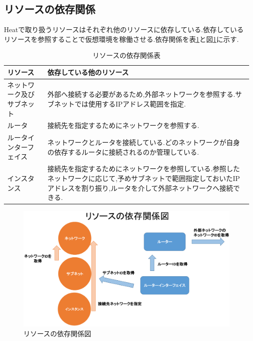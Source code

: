 \documentclass[mingoth]{kut-paper}		%
\begin{document}
	\subsection{リソースの依存関係}
	Heatで取り扱うリソースはそれぞれ他のリソースに依存している.依存しているリソースを参照することで仮想環境を稼働させる.依存関係を表\ref{table:4}と図\ref{graf:7}に示す.
	\begin{table}[H]
		\begin{center}
			\caption{リソースの依存関係表}
			\label{table:4}
			\begin{tabular}{|p{5cm}|p{7cm}|}\hline
				リソース & 依存している他のリソース\\ \hline \hline
				ネットワーク及びサブネット & 外部へ接続する必要があるため,外部ネットワークを参照する.サブネットでは使用するIPアドレス範囲を指定.\\ \hline
				ルータ & 接続先を指定するためにネットワークを参照する.\\ \hline
				ルータインターフェイス & ネットワークとルータを接続している.どのネットワークが自身の依存するルータに接続されるのか管理している.\\ \hline
				インスタンス & 接続先を指定するためにネットワークを参照している.参照したネットワークに応じて,予めサブネットで範囲指定しておいたIPアドレスを割り振り,ルータを介して外部ネットワークへ接続できる.\\ \hline
			\end{tabular}
		\end{center}
	\end{table}
	
	\begin{figure}[H]
		\begin{center}
			\includegraphics[scale=0.45]{Document/ResourcesRelational.eps}
			\caption{リソースの依存関係図}
			\label{graf:7}
		\end{center}
	\end{figure}
	
\end{document}
